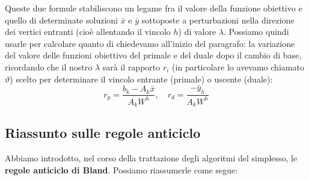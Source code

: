 \documentclass[a4paper,11pt]{article}
\begin{document}
Queste due formule stabiliscono un legame fra il valore della funzione obiettivo e quello di determinate soluzioni $\bar{x}$ e $\bar{y}$ sottoposte a perturbazioni nella direzione dei vertici entranti (cioè allentando il vincolo $h$) di valore $\lambda$.
Possiamo quindi usarle per calcolare quanto di chiedevamo all'inizio del paragrafo: la variazione del valore delle funzioni obiettivo del primale e del duale dopo il cambio di base, ricordando che il nostro $\lambda$ sarà il rapporto $r_i$ (in particolare lo avevamo chiamato $\vartheta$) scelto per determinare il vincolo entrante (primale) o uscente (duale):
$$
r_p = \frac{b_k - A_k \bar{x}}{A_k W^h}, \quad r_d = \frac{-\bar{y}_h}{A_k W^h}
$$

\subsection{Riassunto sulle regole anticiclo}
Abbiamo introdotto, nel corso della trattazione degli algoritmi del simplesso, le \textbf{regole anticiclo di Bland}.
Possiamo riassumerle come segue:
\end{document}
